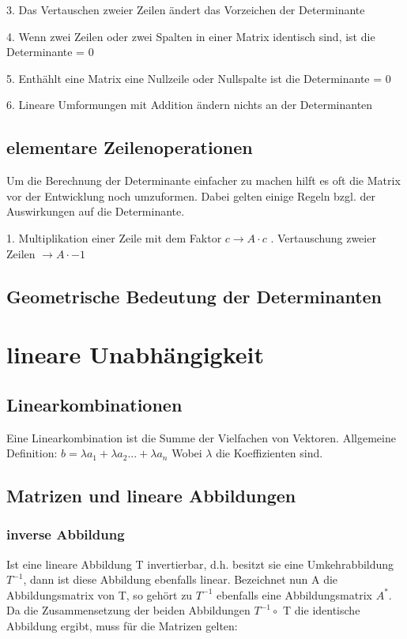 \documentclass[11pt,a4paper,onecolumn]{article}
\begin{document}
\begin{flushleft}
3. Das Vertauschen zweier Zeilen ändert das Vorzeichen der Determinante\linebreak

4. Wenn zwei Zeilen oder zwei Spalten in einer Matrix identisch sind, ist die Determinante = 0\linebreak

5. Enthählt eine Matrix eine Nullzeile oder Nullspalte ist die Determinante = 0\linebreak

6. Lineare Umformungen mit Addition ändern nichts an der Determinanten \linebreak

\subsection{elementare Zeilenoperationen}
Um die Berechnung der Determinante einfacher zu machen hilft es oft die Matrix vor der Entwicklung noch umzuformen. Dabei gelten einige Regeln bzgl. der Auswirkungen auf die Determinante.\linebreak

1. Multiplikation einer Zeile mit dem Faktor $ c \rightarrow A\cdot c$ . Vertauschung zweier Zeilen $ \rightarrow A\cdot-1 $\linebreak


\subsection{Geometrische Bedeutung der Determinanten}


\section{lineare Unabhängigkeit}
\subsection{Linearkombinationen}
Eine Linearkombination ist die Summe der Vielfachen von Vektoren. Allgemeine Definition: \linebreak
$ b = \lambda a_{1} + \lambda a_{2} ... + \lambda a_{n} $
Wobei $\lambda$ die Koeffizienten sind.

\subsection{Matrizen und lineare Abbildungen}
\subsubsection{inverse Abbildung}
Ist eine lineare Abbildung T invertierbar, d.h. besitzt sie eine Umkehrabbildung $ T^{-1} $, dann ist diese Abbildung ebenfalls linear.
Bezeichnet nun A die Abbildungsmatrix von T, so gehört zu $ T^{-1} $ ebenfalls eine Abbildungsmatrix $ A^{*} $. Da die Zusammensetzung der beiden Abbildungen $ T^{-1} \circ $ T die identische Abbildung ergibt, muss für die Matrizen gelten:\linebreak




\end{flushleft}
\end{document}
